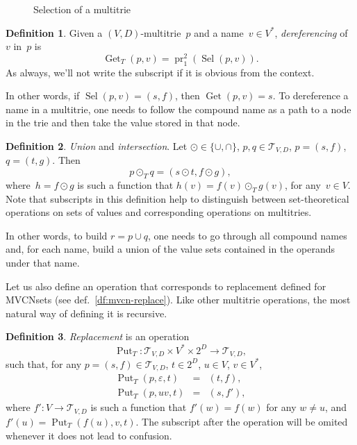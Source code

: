 \documentclass{article}
\theoremstyle{definition}
\newtheorem{Df}{Definition}
\newcommand{\setcharmt}{T}
\newcommand{\setsymbol}[3]{\mathcal{#1}_{#2,#3}}
\newcommand{\setmt}[2]{\setsymbol{\setcharmt}{#1}{#2}}
\newcommand{\select}{\operatorname{Sel}}
\newcommand{\deref}{\operatorname{Get}}
\newcommand{\putval}{\operatorname{Put}}
\newcommand{\proj}[2]{\operatorname{pr}^{#1}_{#2}}
\begin{document}
\begin{figure}[ht]
\begin{center}
\begin{minipage}{17em}
\end{minipage}
\end{center}
\caption{Selection of a multitrie}\label{fig:mt-select}
\end{figure}

\begin{Df}\label{df:mt-deref}
Given a $(V,D)$-multitrie~$p$ and a name~$v\in V^\ast$, \emph{dereferencing}
of~$v$ in~$p$ is
\[
  \deref_\setcharmt(p, v) = \proj{2}{1}(\select(p, v)) .
\]
As always, we'll not write the subscript if it is obvious from the context.
\end{Df}

In other words, if $\select(p,v) = (s,f)$, then $\deref(p, v) = s$. To
dereference a name in a multitrie, one needs to follow the compound name
as a path to a node in the trie and then take the value stored in that node.

\begin{Df}\label{df:mt-setop}
\emph{Union} and \emph{intersection}.
Let $\odot \in \{ \cup, \cap \}$, $p, q \in \setmt{V}{D}$,
$p = (s, f)$, $q = (t, g)$. Then
\[
  p \odot_\setcharmt  q = (s \odot t, f \odot g) ,
\]
where~$h = f \odot g$ is such a function that
$h(v) = f(v) \odot_\setcharmt  g(v)$,
for any~$v \in V$.
Note that subscripts in this definition help to distinguish between
set-theoretical operations on sets of values and corresponding operations
on multitries.
\end{Df}

In other words, to build $r = p \cup q$, one needs to go through all compound
names and, for each name, build a union of the value sets contained in the
operands under that name.

Let us also define an operation that corresponds to replacement
defined for MVCNsets (see def.~\ref{df:mvcn-replace}). Like other multitrie
operations, the most natural way of defining it is recursive.

\begin{Df}\label{df:mt-replace}
\emph{Replacement} is an operation
\[
  \putval_\setcharmt : \setmt{V}{D} \times V^\ast \times 2^D \to \setmt{V}{D},
\]
such that, for any
$p = (s, f) \in \setmt{V}{D}$, $t \in 2^D$, $u \in V$, $v \in V^\ast$,
\begin{eqnarray*}
  \putval_\setcharmt(p, \varepsilon, t) & = & (t, f) , \\
  \putval_\setcharmt(p, u v, t) & = & (s, f') ,
\end{eqnarray*}
where $f' : V \to \setmt{V}{D}$ is such a function that $f'(w) = f(w)$ for any
$w\neq u$, and $f'(u) = \putval_\setcharmt(f(u), v, t)$.
The subscript after the operation will be omited whenever it does not lead to
confusion.
\end{Df}
\end{document}
